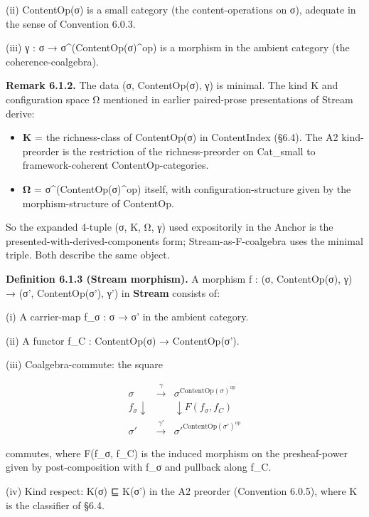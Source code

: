 \documentclass[11pt, openany]{book}
\begin{document}
(ii) ContentOp(σ) is a small category (the content-operations on σ), adequate in the sense of Convention 6.0.3.

(iii) γ : σ → σ\textasciicircum{}(ContentOp(σ)\textasciicircum{}op) is a morphism in the ambient category (the coherence-coalgebra).

\textbf{Remark 6.1.2.} The data (σ, ContentOp(σ), γ) is minimal. The kind K and configuration space Ω mentioned in earlier paired-prose presentations of Stream derive:

\begin{itemize}
\item \textbf{K} = the richness-class of ContentOp(σ) in ContentIndex (§6.4). The A2 kind-preorder is the restriction of the richness-preorder on Cat\_\allowbreak{}small to framework-coherent ContentOp-categories.
\item \textbf{Ω} = σ\textasciicircum{}(ContentOp(σ)\textasciicircum{}op) itself, with configuration-structure given by the morphism-structure of ContentOp.
\end{itemize}

So the expanded 4-tuple (σ, K, Ω, γ) used expositorily in the Anchor is the presented-with-derived-components form; Stream-as-F-coalgebra uses the minimal triple. Both describe the same object.

\textbf{Definition 6.1.3 (Stream morphism).} A morphism f : (σ, ContentOp(σ), γ) → (σ', ContentOp(σ'), γ') in \textbf{Stream} consists of:

(i) A carrier-map f\_\allowbreak{}σ : σ → σ' in the ambient category.

(ii) A functor f\_\allowbreak{}C : ContentOp(σ) → ContentOp(σ').

(iii) Coalgebra-commute: the square

\[
\begin{array}{ccc}
\sigma & \xrightarrow{\gamma} & \sigma^{\mathrm{ContentOp}(\sigma)^{\mathrm{op}}} \\
{\scriptstyle f_\sigma} \downarrow & & \downarrow {\scriptstyle F(f_\sigma, f_C)} \\
\sigma' & \xrightarrow{\gamma'} & \sigma'^{\mathrm{ContentOp}(\sigma')^{\mathrm{op}}}
\end{array}
\]

commutes, where F(f\_\allowbreak{}σ, f\_\allowbreak{}C) is the induced morphism on the presheaf-power given by post-composition with f\_\allowbreak{}σ and pullback along f\_\allowbreak{}C.

(iv) Kind respect: K(σ) ⊑ K(σ') in the A2 preorder (Convention 6.0.5), where K is the classifier of §6.4.
\end{document}
